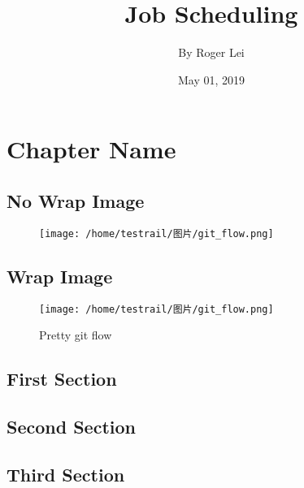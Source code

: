 \documentclass[a4paper,12pt]{report}
\begin{document}
\title{\Large{\textbf{Job Scheduling}}}
\author{By Roger Lei}
\date{May 01, 2019}
\maketitle

\tableofcontents

\chapter{Chapter Name}
\blindmathtrue
\blindtext
\blinditemize
\blindenumerate
\blinddescription

\section*{No Wrap Image}

\begin{figure}[ht]
\blindtext
\centering
\texttt{[image: /home/testrail/图片/git\_flow.png]}
\end{figure}
\blindtext

\section*{Wrap Image}
\begingroup
\setlength{\intextsep}{0pt}
\setlength{\columnwidth}{15pt}

\begin{wrapfigure}{r}{0.4\textwidth}

\texttt{[image: /home/testrail/图片/git\_flow.png]}
\caption{Pretty git flow}\label{fig:prettypic}
\end{wrapfigure}
\blindtext

\endgroup

\section{First Section}
\blindtext[1]
\blinditemize
\blindenumerate
\blinddescription

\section{Second Section}
\blindtext[2]
\newpage

\section{Third Section}
\end{document}
